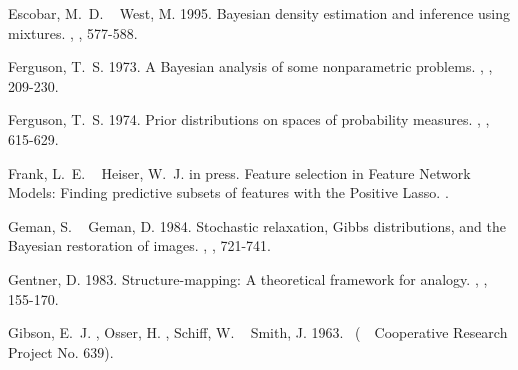 \documentclass[11pt]{article}
\begin{document}
\begin{thebibliography}{}
%
%
Escobar, M.~D.%
\BCBT{}\ \BBA{} West, M.%
%
\newblock{}\BBOP{}1995\BBCP{}.
\newblock{}\BBOQ{}Bayesian density estimation and inference using
  mixtures.\BBCQ{}
\newblock{}, ,
  577-588.

%
%
Ferguson, T.~S.%
%
\newblock{}\BBOP{}1973\BBCP{}.
\newblock{}\BBOQ{}A {B}ayesian analysis of some nonparametric problems.\BBCQ{}
\newblock{}, , 209-230.

%
%
Ferguson, T.~S.%
%
\newblock{}\BBOP{}1974\BBCP{}.
\newblock{}\BBOQ{}Prior distributions on spaces of probability measures.\BBCQ{}
\newblock{}, , 615-629.

%
%
Frank, L.~E.%
\BCBT{}\ \BBA{} Heiser, W.~J.%
%
\newblock{}\BBOP{}in press\BBCP{}.
\newblock{}\BBOQ{}Feature selection in {F}eature {N}etwork {M}odels: {F}inding
  predictive subsets of features with the {P}ositive {L}asso.\BBCQ{}
\newblock{}.

%
%
Geman, S.%
\BCBT{}\ \BBA{} Geman, D.%
%
\newblock{}\BBOP{}1984\BBCP{}.
\newblock{}\BBOQ{}Stochastic relaxation, {G}ibbs distributions, and the
  {B}ayesian restoration of images.\BBCQ{}
\newblock{}, , 721-741.

%
%
Gentner, D.%
%
\newblock{}\BBOP{}1983\BBCP{}.
\newblock{}\BBOQ{}Structure-mapping: A theoretical framework for
  analogy.\BBCQ{}
\newblock{}, , 155-170.

%
%
Gibson, E.~J.%
, Osser, H.%
, Schiff, W.%
\BCBL{}\ \BBA{} Smith, J.%
%
\newblock{}\BBOP{}1963\BBCP{}.
\newblock{}\ (\BTR{}\ \BNUM\ Cooperative Research Project No. 639).
\newblock{}


\end{thebibliography}
\end{document}
